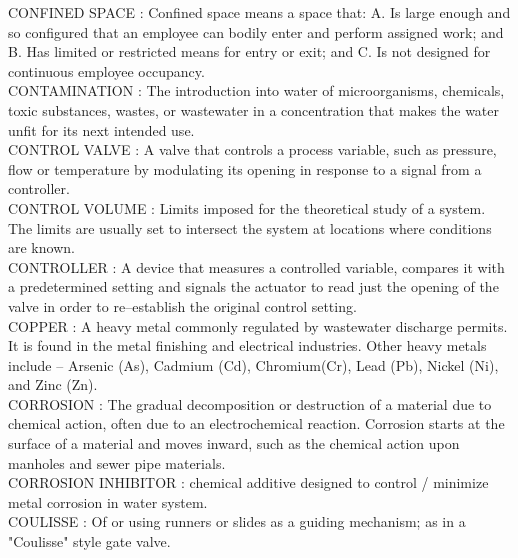 \vspace{0.15cm}
CONFINED SPACE :  Confined space means a space that:  A.     Is large enough and so configured that an employee can bodily enter and perform assigned work; and B.    Has limited or restricted means for entry or exit; and C.     Is not designed for continuous employee occupancy.\\
\vspace{0.15cm}
CONTAMINATION :  The introduction into water of microorganisms, chemicals, toxic substances, wastes, or wastewater in a concentration that makes the water unfit for its next intended use.\\
\vspace{0.15cm}
CONTROL VALVE :   A valve that controls a process variable, such as pressure, flow or temperature by modulating its opening in response to a signal from a controller.\\
\vspace{0.15cm}
CONTROL VOLUME :   Limits imposed for the theoretical study of a system. The limits are usually set to intersect the system at locations where conditions are known.\\
\vspace{0.15cm}
CONTROLLER :   A device that measures a controlled variable, compares it with a predetermined setting and signals the actuator to read just the opening of the valve in order to re–establish the original control setting.\\
\vspace{0.15cm}
COPPER :   A heavy metal commonly regulated by wastewater discharge permits. It is found in the metal finishing and electrical industries. Other heavy metals include – Arsenic (As), Cadmium (Cd), Chromium(Cr), Lead (Pb), Nickel (Ni), and Zinc (Zn).\\
\vspace{0.15cm}
CORROSION :  The gradual decomposition or destruction of a material due to chemical action, often due to an electrochemical reaction. Corrosion starts at the surface of a material and moves inward, such as the chemical action upon manholes and sewer pipe materials. \\
\vspace{0.15cm}
CORROSION INHIBITOR :  chemical additive designed to control / minimize metal corrosion in water system.\\
\vspace{0.15cm}
COULISSE :   Of or using runners or slides as a guiding mechanism; as in a "Coulisse" style gate valve.\\
